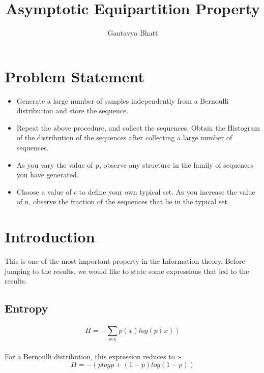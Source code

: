 \documentclass[11pt]{article}
\title{Asymptotic Equipartition Property}
\author{Gantavya Bhatt}
\begin{document}
\maketitle

\vspace{0.5in}



\section{Problem Statement}

\begin{itemize}
    \item Generate a large number of samples independently from a Bernoulli 
distribution and store the sequence.
\item  Repeat the above procedure, and collect the sequences. Obtain the
Histogram of the distribution of the sequences after collecting a large
number of sequences.
\item As you vary the value of p, observe any structure in the family of
sequences you have generated.
\item Choose a value of \(\epsilon\) to define your own typical set. As you
increase the value of n, observe the fraction of the sequences that lie
in the typical set.
\end{itemize}

\section{Introduction}
This is one of the most important property in the Information theory. Before jumping to the results, we would like to state some expressions that led to the results. 
\subsection{Entropy}
\[ H =  -\sum_{x\epsilon \chi}^{} p(x)log(p(x))\]
\\
For a Bernoulli distribution, this expression reduces to :- \\
\[ H = - (plogp + (1-p)log(1-p))\]

\pagebreak
\end{document}
